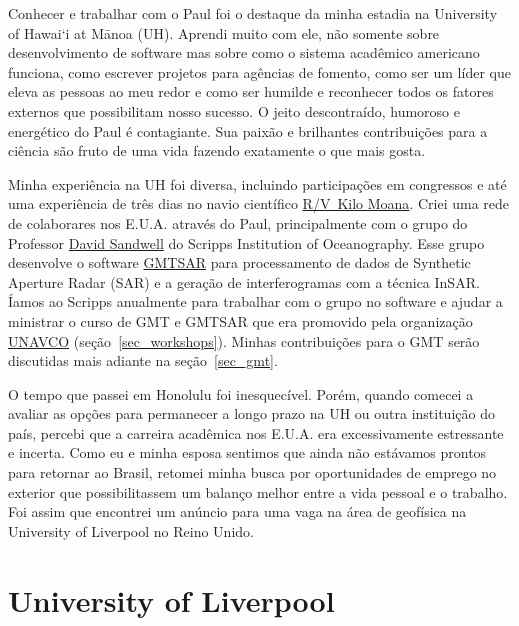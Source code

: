 \documentclass[10pt,a4paper,oneside]{book}
\newcommand{\UHM}{University of Hawai`i at M\={a}noa}
\begin{document}
Conhecer e trabalhar com o Paul foi o destaque da minha estadia na
\UHM{} (UH).
Aprendi muito com ele, não somente sobre desenvolvimento de software mas sobre
como o sistema acadêmico americano funciona, como escrever projetos para
agências de fomento, como ser um líder que eleva as pessoas ao meu redor e como
ser humilde e reconhecer todos os fatores externos que possibilitam nosso
sucesso.
O jeito descontraído, humoroso e energético do Paul é contagiante.
Sua paixão e brilhantes contribuições para a ciência são fruto de uma vida
fazendo exatamente o que mais gosta.

Minha experiência na UH foi diversa, incluindo participações em congressos e
até uma experiência de três dias no navio científico
\href{https://www.soest.hawaii.edu/soestwp/tech/watercraft/kilo-moana/}{R/V Kilo Moana}.
Criei uma rede de colaborares nos E.U.A. através do Paul, principalmente com
o grupo do Professor \href{https://topex.ucsd.edu/sandwell/}{David Sandwell}
do Scripps Institution of Oceanography.
Esse grupo desenvolve o software \href{https://github.com/gmtsar}{GMTSAR} para
processamento de dados de Synthetic Aperture Radar (SAR) e a geração de
interferogramas com a técnica InSAR.
Íamos ao Scripps anualmente para trabalhar com o grupo no software e ajudar a
ministrar o curso de GMT e GMTSAR que era promovido pela organização
\href{https://www.unavco.org/}{UNAVCO} (seção~\ref{sec_workshops}).
Minhas contribuições para o GMT serão discutidas mais adiante na
seção~\ref{sec_gmt}.

O tempo que passei em Honolulu foi inesquecível.
Porém, quando comecei a avaliar as opções para permanecer a longo prazo na UH
ou outra instituição do país, percebi que a carreira acadêmica nos E.U.A. era
excessivamente estressante e incerta.
Como eu e minha esposa sentimos que ainda não estávamos prontos para retornar
ao Brasil, retomei minha busca por oportunidades de emprego no exterior que
possibilitassem um balanço melhor entre a vida pessoal e o trabalho.
Foi assim que encontrei um anúncio para uma vaga na área de geofísica na
University of Liverpool no Reino Unido.


\section{University of Liverpool}
\end{document}
